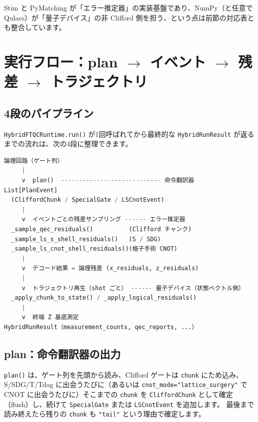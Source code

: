 Stim と PyMatching が「エラー推定器」の実装基盤であり、NumPy（と任意で Qulacs）が「量子デバイス」の非 Clifford 側を担う、という点は前節の対応表とも整合しています。

\section{実行フロー：plan \texorpdfstring{$\to$}{→} イベント \texorpdfstring{$\to$}{→} 残差 \texorpdfstring{$\to$}{→} トラジェクトリ}\label{sec:flow}

\subsection{4段のパイプライン}

\lstinline{HybridFTQCRuntime.run()} が1回呼ばれてから最終的な \lstinline{HybridRunResult} が返るまでの流れは、次の4段に整理できます。

\begin{lstlisting}[language=Python, caption={実行フローの骨格（概念図）}, label={lst:flow_ascii}]
論理回路（ゲート列）
     |
     v  plan()  ---------------------------- 命令翻訳器
List[PlanEvent]
  (CliffordChunk / SpecialGate / LSCnotEvent)
     |
     v  イベントごとの残差サンプリング ------ エラー推定器
  _sample_qec_residuals()          (Clifford チャンク)
  _sample_ls_s_shell_residuals()   (S / SDG)
  _sample_ls_cnot_shell_residuals()(格子手術 CNOT)
     |
     v  デコード結果 = 論理残差 (x_residuals, z_residuals)
     |
     v  トラジェクトリ再生（shot ごと） ------ 量子デバイス（状態ベクトル側）
  _apply_chunk_to_state() / _apply_logical_residuals()
     |
     v  終端 Z 基底測定
HybridRunResult（measurement_counts, qec_reports, ...）
\end{lstlisting}

\subsection{plan：命令翻訳器の出力}

\lstinline{plan()} は、ゲート列を先頭から読み、Clifford ゲートは \lstinline{chunk} にため込み、S/SDG/T/Tdag に出会うたびに（あるいは \lstinline{cnot_mode="lattice_surgery"} で CNOT に出会うたびに）そこまでの \lstinline{chunk} を \lstinline{CliffordChunk} として確定（flush）し、続けて \lstinline{SpecialGate} または \lstinline{LSCnotEvent} を追加します。
最後まで読み終えたら残りの \lstinline{chunk} も \lstinline{"tail"} という理由で確定します。

